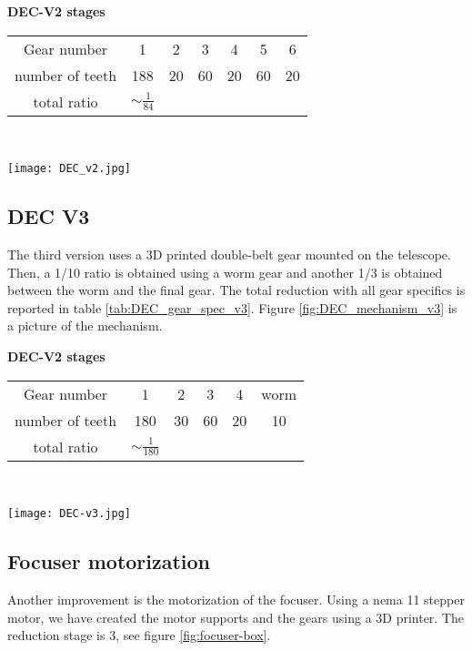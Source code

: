 \begin{minipage}
    {0.5\textwidth}
    \centering
    \textbf{DEC-V2 stages}\\
    \begin{tabular}{ccccccc}
        \hline
        Gear number & 1 & 2 & 3 & 4 & 5 & 6\\
        number of teeth & 188 & 20 & 60 & 20 & 60 & 20\\
        \hline
        total ratio & \(\sim \frac{1}{84}\) &&&
    \end{tabular}
    \label{tab:DEC_gear_spec_v2}
\end{minipage}
\\
\begin{minipage}
    {0.5\textwidth}
    \centering
    \texttt{[image: DEC\_v2.jpg]}
    \label{fig:DEC_mechanism_v2}
\end{minipage}

\subsection{DEC V3}
The third version uses a 3D printed double-belt gear mounted on the telescope.
Then, a 1/10 ratio is obtained using a worm gear and another 1/3 is obtained between the worm and the final gear.
The total reduction with all gear specifics is reported in table \ref{tab:DEC_gear_spec_v3}.
Figure \ref{fig:DEC_mechanism_v3} is a picture of the mechanism.

\begin{minipage}
    {0.5\textwidth}
    \centering
    \textbf{DEC-V2 stages}\\
    \begin{tabular}{cccccc}
        \hline
        Gear number & 1 & 2 & 3 & 4 & worm\\
        number of teeth & 180 & 30 & 60 & 20 & 10\\
        \hline
        total ratio & \(\sim \frac{1}{180}\) &&&
    \end{tabular}
    \label{tab:DEC_gear_spec_v2}
\end{minipage}
\\
\begin{minipage}
    {0.5\textwidth}
    \centering
    \texttt{[image: DEC-v3.jpg]}
    \label{fig:DEC_mechanism_v3}
\end{minipage}

\subsection{Focuser motorization}
Another improvement is the motorization of the focuser.
Using a nema 11 stepper motor, we have created the motor supports and the gears using a 3D printer.
The reduction stage is 3, see figure \ref{fig:focuser-box}.